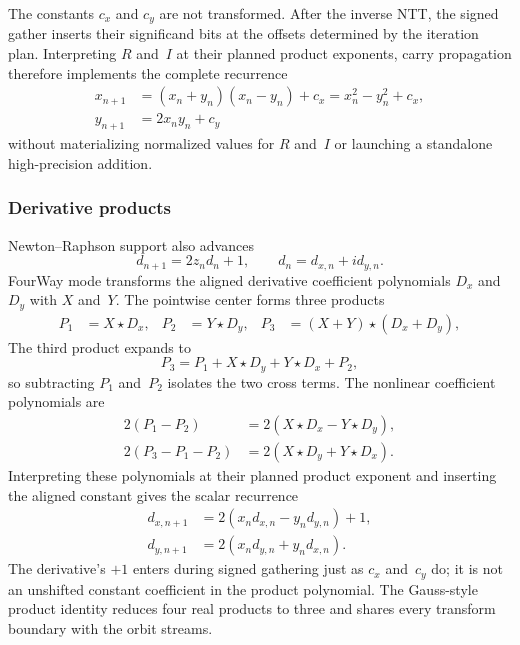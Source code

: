 The constants $c_x$ and $c_y$ are not transformed.  After the inverse NTT,
the signed gather inserts their significand bits at the offsets determined by
the iteration plan.  Interpreting $R$ and~$I$ at their planned product
exponents, carry propagation therefore implements the complete recurrence
\begin{align}
  x_{n+1} &= (x_n+y_n)(x_n-y_n)+c_x
           =x_n^2-y_n^2+c_x, \\
  y_{n+1} &= 2x_ny_n+c_y
\end{align}
without materializing normalized values for $R$ and~$I$ or launching a
standalone high-precision addition.

\subsubsection{Derivative products}
\label{subsec:fused-ntt-derivatives}

Newton--Raphson support also advances
\begin{equation}
  d_{n+1}=2z_nd_n+1,
  \qquad d_n=d_{x,n}+i d_{y,n}.
  \label{eq:fused-dzdc-complex}
\end{equation}
FourWay mode transforms the aligned derivative coefficient polynomials $D_x$
and $D_y$ with $X$ and~$Y$.  The pointwise center forms three products
\begin{align}
  P_1 &= X\star D_x, &
  P_2 &= Y\star D_y, &
  P_3 &= (X+Y)\star(D_x+D_y),
  \label{eq:fused-derivative-products}
\end{align}
The third product expands to
\begin{equation}
  P_3=P_1+X\star D_y+Y\star D_x+P_2,
\end{equation}
so subtracting $P_1$ and~$P_2$ isolates the two cross terms.  The nonlinear
coefficient polynomials are
\begin{align}
  2(P_1-P_2) &= 2(X\star D_x-Y\star D_y), \\
  2(P_3-P_1-P_2) &= 2(X\star D_y+Y\star D_x).
\end{align}
Interpreting these polynomials at their planned product exponent and inserting
the aligned constant gives the scalar recurrence
\begin{align}
  d_{x,n+1} &= 2(x_n d_{x,n}-y_n d_{y,n})+1, \\
  d_{y,n+1} &= 2(x_n d_{y,n}+y_n d_{x,n}).
  \label{eq:fused-derivative-reconstruction}
\end{align}
The derivative's $+1$ enters during signed gathering just as $c_x$ and~$c_y$
do; it is not an unshifted constant coefficient in the product polynomial.
The Gauss-style product identity reduces four real products to three and
shares every transform boundary with the orbit streams.

